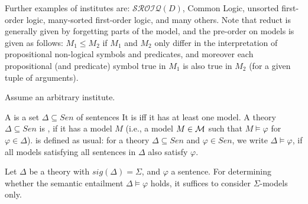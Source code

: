 \documentclass[10pt,%
\ifpretendfinal
final%
\else
draft%
\fi,
]{scrreprt}
\begin{document}
Further examples of institutes are: $\mathcal{SROIQ}(D)$, Common
Logic, unsorted first-order logic, many-sorted first-order logic, and
many others.  Note that reduct is generally given by forgetting parts
of the model, and the pre-order on models is given as follows:
$M_1\leq M_2$ if $M_1$ and $M_2$ only differ in the interpretation of
propositional non-logical symbols and predicates, and moreover each propositional
(and predicate) symbol true in $M_1$ is also true in $M_2$ (for a
given tuple of arguments).

Assume an arbitrary institute.

A  is a set $\Delta\subseteq Sen$ of sentences
It is  iff it has at least one model.
A theory $\Delta\subseteq Sen$ is , if it has a model
$M$ (i.e., a model $M \in {\cal M}$
such that $M\models\varphi$ for $\varphi\in\Delta$).
 is defined as usual: for 
a theory $\Delta\subseteq Sen$ and $\varphi\in Sen$, we write
$\Delta\models\varphi$, if all models satisfying all sentences in
$\Delta$ also satisfy $\varphi$.


\begin{lemma}
  Let $\Delta$ be a theory with $sig(\Delta)=\Sigma$, and $\varphi$ a
  sentence. For determining whether the semantic entailment
  $\Delta\models\varphi$ holds, it suffices to consider
  $\Sigma$-models only.
\end{lemma}
\end{document}
